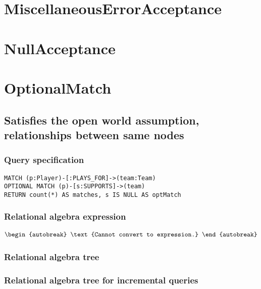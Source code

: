 \section{MiscellaneousErrorAcceptance}

\section{NullAcceptance}

\section{OptionalMatch}


\subsection{Satisfies the open world assumption, relationships between same nodes}

\subsubsection*{Query specification}

\begin{lstlisting}
MATCH (p:Player)-[:PLAYS_FOR]->(team:Team)
OPTIONAL MATCH (p)-[s:SUPPORTS]->(team)
RETURN count(*) AS matches, s IS NULL AS optMatch
\end{lstlisting}

\subsubsection*{Relational algebra expression}

\begin{align*}
\begin{autobreak}
\text{Cannot convert to expression.}
\end{autobreak}
\end{align*}

\subsubsection*{Relational algebra tree}


\subsubsection*{Relational algebra tree for incremental queries}

